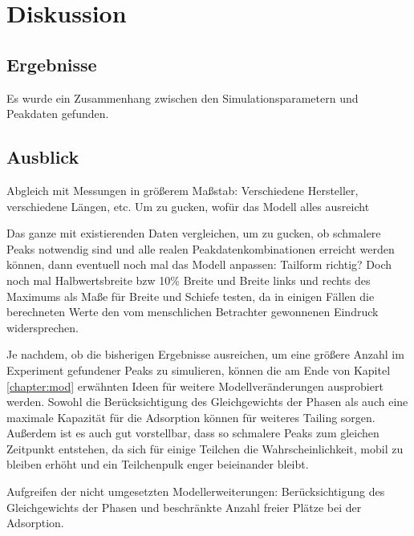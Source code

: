 \chapter{Diskussion}
\label{chapter:dis}

\section{Ergebnisse}
Es wurde ein Zusammenhang zwischen den Simulationsparametern und Peakdaten gefunden.


\section{Ausblick}

Abgleich mit Messungen in größerem Maßstab: Verschiedene Hersteller, verschiedene Längen, etc. Um zu gucken, wofür das Modell alles ausreicht

Das ganze mit existierenden Daten vergleichen, um zu gucken, ob schmalere Peaks notwendig sind und alle realen Peakdatenkombinationen erreicht werden können, dann eventuell noch mal das Modell anpassen:
Tailform richtig?
Doch noch mal Halbwertsbreite bzw 10\% Breite und Breite links und rechts des Maximums als Maße für Breite und Schiefe testen, da in einigen Fällen die berechneten Werte den vom menschlichen Betrachter gewonnenen Eindruck widersprechen.


Je nachdem, ob die bisherigen Ergebnisse ausreichen, um eine größere Anzahl im Experiment gefundener Peaks zu simulieren, können die am Ende von Kapitel \ref{chapter:mod} erwähnten Ideen für weitere Modellveränderungen ausprobiert werden. Sowohl die Berücksichtigung des Gleichgewichts der Phasen als auch eine maximale Kapazität für die Adsorption können für weiteres Tailing sorgen. Außerdem ist es auch gut vorstellbar, dass so schmalere Peaks zum gleichen Zeitpunkt entstehen, da sich für einige Teilchen die Wahrscheinlichkeit, mobil zu bleiben erhöht und ein Teilchenpulk enger beieinander bleibt.

Aufgreifen der nicht umgesetzten Modellerweiterungen: Berücksichtigung des Gleichgewichts der Phasen und beschränkte Anzahl freier Plätze bei der Adsorption.

